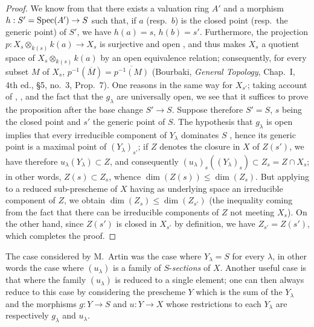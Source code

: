 \begin{proof}
We know from  that there exists a valuation ring $A'$ and a morphism $h:S'=\operatorname{Spec}(A')\to S$ such that, if $a$ (resp.\ $b$) is the closed point (resp.\ the generic point) of $S'$, we have $h(a)=s$, $h(b)=s'$.
Furthermore, the projection $p:X_s\otimes_{k(s)}k(a)\to X_s$ is surjective and open , and thus makes $X_s$ a quotient space of $X_s\otimes_{k(s)}k(a)$ by an open equivalence relation; consequently, for every subset $M$ of $X_s$, $p^{-1}(\overline{M})=\overline{p^{-1}(M)}$ (Bourbaki, \emph{General Topology}, Chap.~I, 4th ed., \S5, no.~3, Prop.~7).
One reasons in the same way for $X_{s'}$; taking account of , , and the fact that the $g_\lambda$ are universally open, we see that it suffices to prove the proposition after the base change $S'\to S$.
Suppose therefore $S'=S$, $s$ being the closed point and $s'$ the generic point of $S$.
The hypothesis that $g_\lambda$ is open implies that every irreducible component of $Y_\lambda$ dominates $S$ , hence its generic point is a maximal point of $(Y_\lambda)_{s'}$; if $Z$ denotes the closure in $X$ of $Z(s')$, we have therefore $u_\lambda(Y_\lambda)\subset Z$, and consequently $(u_\lambda)_s((Y_\lambda)_s)\subset Z_s=Z\cap X_s$; in other words, $Z(s)\subset Z_s$, whence $\dim(Z(s))\leq\dim(Z_s)$.
But applying  to a reduced sub-prescheme of $X$ having as underlying space an irreducible component of $Z$, we obtain $\dim(Z_s)\leq\dim(Z_{s'})$ (the inequality coming from the fact that there can be irreducible components of $Z$ not meeting $X_s$).
On the other hand, since $Z(s')$ is closed in $X_{s'}$ by definition, we have $Z_{s'}=Z(s')$, which completes the proof.
\end{proof}

\begin{remark}[14.3.12]
\label{IV.14.3.12}
The case considered by M.\ Artin was the case where $Y_\lambda=S$ for every $\lambda$, in other words the case where $(u_\lambda)$ is a family of $S$-\emph{sections} of $X$.
Another useful case is that where the family $(u_\lambda)$ is reduced to a single element; one can then always reduce to this case by considering the prescheme $Y$ which is the sum of the $Y_\lambda$ and the morphisms $g:Y\to S$ and $u:Y\to X$ whose restrictions to each $Y_\lambda$ are respectively $g_\lambda$ and $u_\lambda$.
\end{remark}

